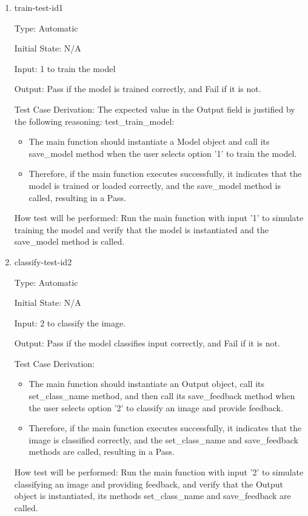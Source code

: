\documentclass[12pt, titlepage]{article}
\begin{document}
\begin{enumerate}

\item{train-test-id1\\}

Type: Automatic
					
Initial State: N/A
					
Input: 1 to train the model
					
Output: Pass if the model is trained correctly, and Fail if it is not.

Test Case Derivation: The expected value in the Output field is justified by the following reasoning:
test\_train\_model:
  \begin{itemize}
    \item The main function should instantiate a Model object and call its save\_model 
    method when the user selects option '1' to train the model.
    \item Therefore, if the main function executes successfully, it indicates that 
    the model is trained or loaded correctly, and the save\_model method is called, resulting in a Pass.
  \end{itemize}


How test will be performed: 
Run the main function with input '1' to simulate training the model and verify 
that the model is instantiated and the save\_model method is called.
					
\item{classify-test-id2\\}

Type: Automatic
					
Initial State: N/A
					
Input: 2 to classify the image.

Output: Pass if the model classifies input correctly, and Fail if it is not.

Test Case Derivation: 
\begin{itemize}
  \item The main function should instantiate an Output object, 
  call its set\_class\_name method, and then call its save\_feedback 
  method when the user selects option '2' to classify an image and provide feedback.
  \item Therefore, if the main function executes successfully, it indicates that 
  the image is classified correctly, and the set\_class\_name and save\_feedback methods 
  are called, resulting in a Pass.
\end{itemize}

How test will be performed: Run the main function with input '2' to simulate classifying an image 
and providing feedback, and verify that the Output object is instantiated, 
its methods set\_class\_name and save\_feedback are called.
    
\end{enumerate}
\end{document}
